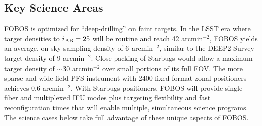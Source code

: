 

\subsection{Key Science Areas}

FOBOS is optimized for ``deep-drilling'' on faint targets. In the LSST era where target densities to $i_{\rm AB} = 25$
will be routine and reach 42 arcmin$^{-2}$, FOBOS yields an average, on-sky sampling density of 6 arcmin$^{-2}$,
similar to the DEEP2 Survey target density of 9 arcmin$^{-2}$. Close packing of Starbugs would allow a maximum target
density of $\sim$30 arcmin$^{-2}$ over small portions of its full FOV. The more sparse and wide-field PFS instrument
with 2400 fixed-format zonal positioners achieves 0.6 arcmin$^{-2}$. With Starbugs positioners, FOBOS will provide
single-fiber and multiplexed IFU modes plus targeting flexibility and fast reconfiguration times that will enable
multiple, simultaneous science programs. The science cases below take full advantage of these unique aspects of FOBOS.


